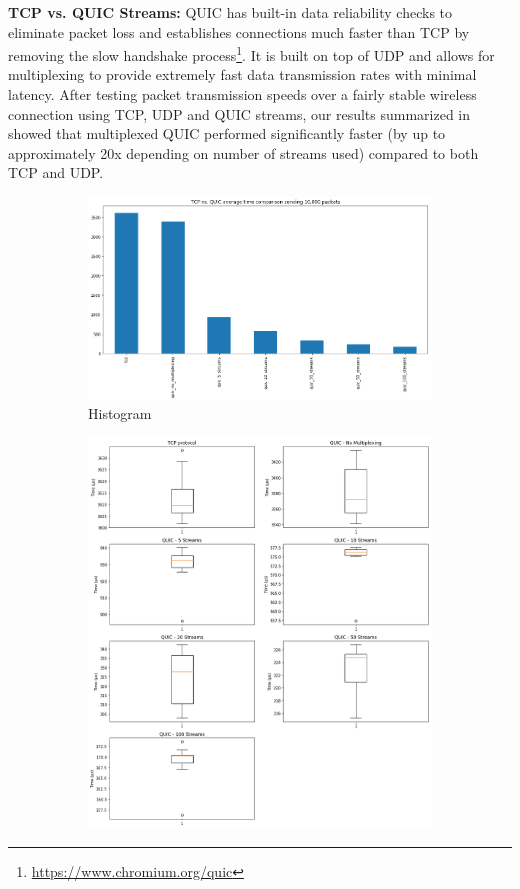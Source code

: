\noindent\textbf{TCP vs. QUIC Streams:} QUIC has built-in data reliability checks to eliminate packet loss and establishes connections much faster than TCP by removing the slow handshake process\footnote{\url{https://www.chromium.org/quic}}.
It is built on top of UDP and allows for multiplexing to provide extremely fast data transmission rates with minimal latency. After testing packet transmission speeds over a fairly stable wireless connection using TCP, UDP and QUIC streams, our results summarized in  showed that multiplexed QUIC performed significantly faster (by up to approximately 20x depending on number of streams used) compared to both TCP and UDP.\\
\begin{figure}
\centering
\begin{subfigure}{0.7\textwidth}
    \includegraphics[width=\linewidth]{images/tcp-quic-bar-graph.png}
    \caption{Histogram}
\end{subfigure}
\begin{subfigure}{0.7\textwidth}
  \includegraphics[width=\linewidth]{images/streams-box-plots.png}

\end{subfigure}
\end{figure}
